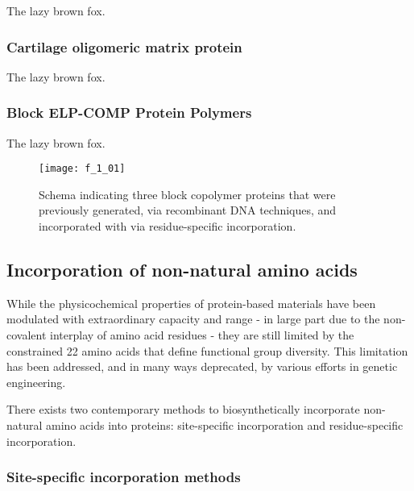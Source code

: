 \begin{refsection}
The lazy brown fox.

\subsubsection{Cartilage oligomeric matrix protein}

The lazy brown fox.

\subsubsection{Block ELP-COMP Protein Polymers}

The lazy brown fox.

\begin{figure}[h!]
    \centering
    \texttt{[image: f\_1\_01]}
    \caption{Schema indicating three block copolymer proteins that were
        previously generated, via recombinant DNA techniques, and incorporated
        with  via residue-specific incorporation.
    }
    \label{fig:pff_proteins}
\end{figure}

\subsection{Incorporation of non-natural amino acids}

While the physicochemical properties of protein-based materials have been
modulated with extraordinary capacity and range\cite{} - in large part due to
the non-covalent interplay of amino acid residues - they are still limited by
the constrained 22 amino acids that define functional group diversity.\cite{}
This limitation has been addressed, and in many ways deprecated, by various
efforts in genetic engineering.\cite{} 

There exists two contemporary methods to biosynthetically incorporate
non-natural amino acids into proteins: site-specific incorporation and
residue-specific incorporation.

\subsubsection{Site-specific incorporation methods} 



\end{refsection}
